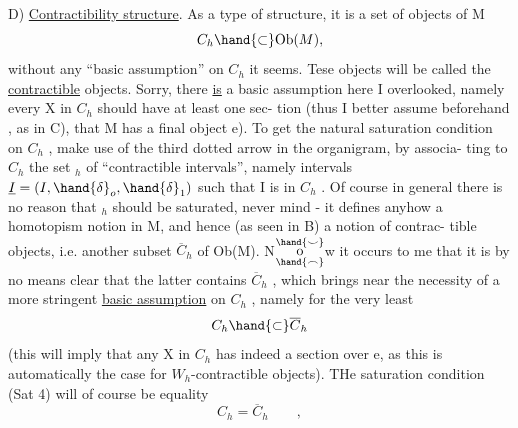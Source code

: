 D) \uline{Contractibility structure}.  As a type of structure, it is a
set of objects of M
\[ C_h\hand{\ensuremath{\subset}}\mathrm{Ob}(M) , \]
without any ``basic assumption'' on $C_h$ it seems. Tese objects will be
called the \uline{contractible} objects. Sorry, there \uline{is} a basic assumption
here I  overlooked,  namely every X in $C_h$ should have at least one sec-%
tion (thus I better assume beforehand , as in C), that M has a final
object e). To get the natural saturation condition on $C_h$ , 
 make use of the third dotted arrow in the organigram, by associa-%
ting to $C_h$ the set \hand{$\Sigma$}$_h$ of ``contractible intervals'', namely intervals
$\underline{I} = (I, \hand{\delta}_o,\hand{\delta}_1)$ such that I is in $C_h$ . Of course in general there is no
reason that \hand{$\Sigma$}$_h$ should be saturated, never mind - it defines anyhow 
a homotopism notion in M, and hence (as seen in B) a notion of contrac-%
tible objects, i.e. another subset $\overline{C}_h$ of Ob(M). N$\overset{\hand{\smile}}{\underset{\hand{\frown}}{\mathrm o}}$w it occurs to  me
that it is by no means clear that the latter contains $\overline{C}_h$ , which
brings near the necessity of a more stringent \uline{basic assumption} on $C_h$ ,
namely for the very least
\[ C_h\hand{\ensuremath{\subset}}\overline{C}_h \]
(this will imply that any X in $C_h$ has indeed a section over e, as this
is automatically the case for $W_h$-contractible objects). THe saturation
condition (Sat 4) will of course be equality
\[ C_h = \overline{C}_h \qquad , \]
